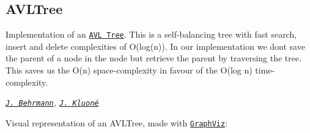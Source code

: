 \subsection*{A\+V\+L\+Tree \href{https://travis-ci.org/ob-algdati-ws17/blatt-7-aufgabe-1-p-p}{\tt }}

Implementation of an \href{https://en.wikipedia.org/wiki/AVL_tree}{\tt A\+VL Tree}. This is a self-\/balancing tree with fast search, insert and delete complexities of O(log(n)). In our implementation we don\textquotesingle{}t save the \textquotesingle{}parent\textquotesingle{} of a node in the node but retrieve the parent by traversing the tree. This saves us the O(n) space-\/complexity in favour of the O(log n) time-\/complexity.

{\itshape \href{https://github.com/jjxxs}{\tt J. Behrmann}, \href{https://github.com/JustinaKluone}{\tt J. Kluoné}}

Visual representation of an A\+V\+L\+Tree, made with \href{https://graphviz.gitlab.io/}{\tt Graph\+Viz}\+:  